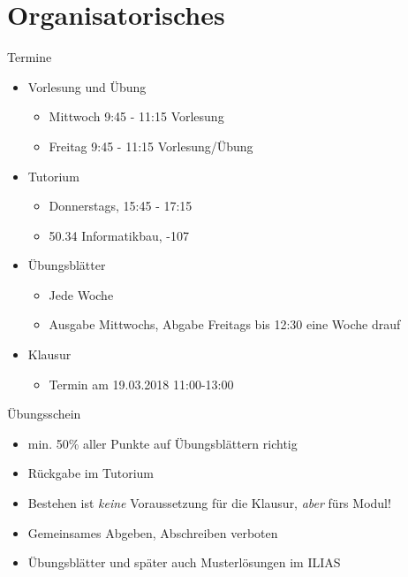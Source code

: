 \documentclass{beamer}
\begin{document}

\begin{frame}
	\titlepage
\end{frame}

\section{Organisatorisches}

\begin{frame}{Termine}
	\begin{itemize}
		 
		\item Vorlesung und Übung
			\begin{itemize}
				\item Mittwoch 9:45 - 11:15 Vorlesung
				\item Freitag 9:45 - 11:15 Vorlesung/Übung
			\end{itemize}
		
		 
		\item Tutorium
			\begin{itemize}
				\item Donnerstags, 15:45 - 17:15
				\item 50.34 Informatikbau, -107
			\end{itemize}
		
		 
		\item Übungsblätter
		\begin{itemize}
			\item Jede Woche
			\item Ausgabe Mittwochs, Abgabe Freitags bis 12:30 eine Woche drauf 
		\end{itemize}
		 
		\item Klausur
		\begin{itemize}
			\item Termin am 19.03.2018 11:00-13:00
		\end{itemize}
	\end{itemize}
\end{frame}

\begin{frame}{Übungsschein}
	\begin{itemize}
		 
		\item min. 50\% aller Punkte auf Übungsblättern richtig 
		\item Rückgabe im Tutorium 
		\item Bestehen ist \emph{keine} Voraussetzung für die Klausur, \emph{aber} fürs Modul! 
		\item Gemeinsames Abgeben, Abschreiben verboten 
		\item Übungsblätter und später auch Musterlösungen im ILIAS
	\end{itemize}
\end{frame}
\end{document}
